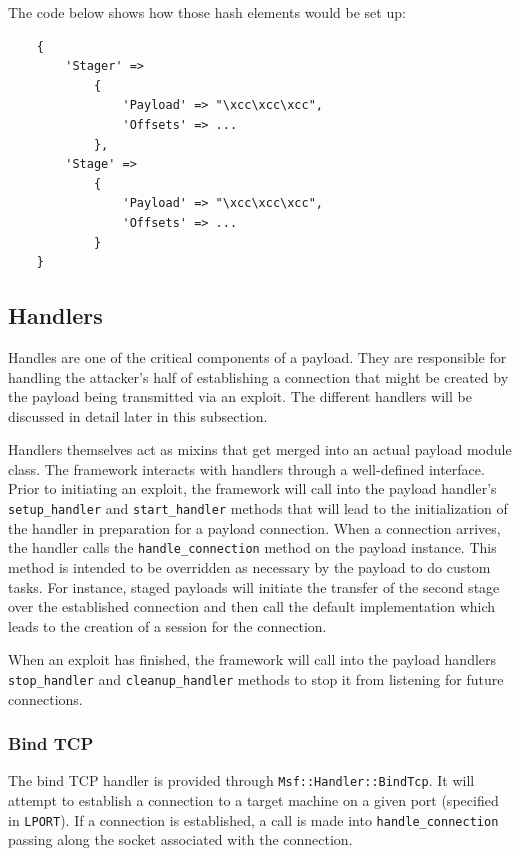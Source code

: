 \documentclass{report}
\begin{document}
\par
The code below shows how those hash elements would be set up:


\begin{verbatim}
    {
        'Stager' =>
            {
                'Payload' => "\xcc\xcc\xcc",
                'Offsets' => ...
            },
        'Stage' =>
            {
                'Payload' => "\xcc\xcc\xcc",
                'Offsets' => ...
            }
    }
\end{verbatim}

        \subsection{Handlers}

\par
Handles are one of the critical components of a payload.  They are
responsible for handling the attacker's half of establishing a
connection that might be created by the payload being transmitted
via an exploit.  The different handlers will be discussed in detail
later in this subsection.

\par
Handlers themselves act as mixins that get merged into an actual
payload module class.  The framework interacts with handlers through
a well-defined interface.  Prior to initiating an exploit, the
framework will call into the payload handler's
\texttt{setup\_handler} and \texttt{start\_handler} methods that
will lead to the initialization of the handler in preparation for a
payload connection.  When a connection arrives, the handler calls
the \texttt{handle\_connection} method on the payload instance. This
method is intended to be overridden as necessary by the payload to
do custom tasks.  For instance, staged payloads will initiate the
transfer of the second stage over the established connection and
then call the default implementation which leads to the creation of
a session for the connection.

\par
When an exploit has finished, the framework will call into the
payload handlers \texttt{stop\_handler} and
\texttt{cleanup\_handler} methods to stop it from listening for
future connections.

            \subsubsection{Bind TCP}

\par
The bind TCP handler is provided through
\texttt{Msf::Handler::BindTcp}.  It will attempt to establish a
connection to a target machine on a given port (specified in
\texttt{LPORT}).  If a connection is established, a call is made
into \texttt{handle\_connection} passing along the socket associated
with the connection.
\end{document}
